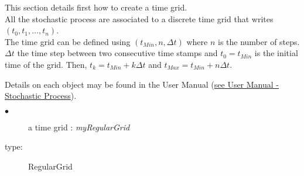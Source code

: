 \renewcommand{\filename}{docUC_RegularGrid.tex}
\renewcommand{\filetitle}{UC : Creation of a time grid}

 \HeaderIILevel

\label{UCtimeGrig}




This section details first how to create a time grid.\\

All the stochastic process are associated to a discrete time grid that writes $(t_0, t_1, \hdots, t_{n})$.\\ 
The time grid can be defined using $(t_{Min}, n, \Delta t)$ where $n$ is the number of steps. $\Delta t$ the time step between two consecutive time stamps and $t_0 = t_{Min}$ is the initial time of the grid. Then,  $t_k = t_{Min} + k \Delta t$ and $t_{Max} = t_{Min} +  n \Delta t$.

Details on each object may be found in the User Manual  (\href{OpenTURNS_UserManual_TUI.pdf}{see User Manual -  Stochastic Process}).\\

{
  \begin{description}
  \item[$\bullet$] a time grid : {\itshape myRegularGrid}
  \item[type:]  RegularGrid
  \end{description}
}


